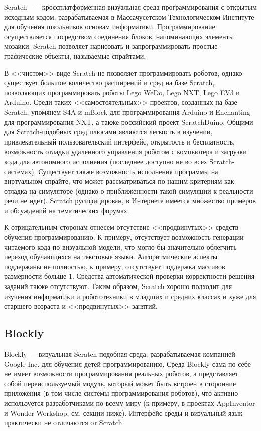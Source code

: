 \documentclass[a5paper]{article}
\begin{document}
Scratch~\cite{resnick2009scratch} --- кроссплатформенная визуальная среда программирования с 
открытым исходным кодом, разрабатываемая 
в Массачусетском Технологическом Институте для обучения школьников основам информатики. Программирование 
осуществляется посредством соединения блоков, напоминающих элементы мозаики. Scratch позволяет нарисовать 
и запрограммировать простые графические объекты, называемые спрайтами. 

В <<чистом>> виде Scratch не позволяет программировать роботов, однако существует большое количество расширений и 
сред на базе Scratch, позволяющих программировать роботы Lego WeDo, Lego NXT, Lego EV3 и Arduino.  Среди таких 
<<самостоятельных>> проектов, созданных на базе Scratch, упомянем S4A и mBlock для программирования Arduino и 
Enchanting для программирования NXT, а также российский проект ScratchDuino. Общими для Scratch-подобных 
сред плюсами являются легкость в изучении, привлекательный пользовательский интерфейс, открытость и бесплатность, 
возможность отладки удаленного управления роботом с компьютера и загрузки кода для автономного исполнения 
(последнее доступно не во всех Scratch-системах). Существует также возможность исполнения программы на виртуальном 
спрайте, что может рассматриваться по нашим критериям как отладка на симуляторе (однако о приближенности такой 
симуляции к реальности речи не идет). Scratch русифицирован, в Интернете имеется множество примеров 
и обсуждений на тематических форумах. 

К отрицательным сторонам отнесем отсутствие <<продвинутых>> средств обучения программированию. К примеру, 
отсутствует возможность генерации читаемого кода по визуальной модели, что могло бы значительно облегчить 
переход обучающихся на текстовые языки. Алгоритмические аспекты поддержаны не полностью, к примеру, 
отсутствует поддержка массивов размерности больше 1. Средства автоматической проверки корректности решения 
заданий также отсутствуют. Таким образом, Scratch хорошо подходит для изучения информатики и робототехники 
в младших и средних классах и хуже для старшего возраста и <<продвинутых>> занятий.

\subsection{Blockly}
\label{chapter:blockly}

Blockly --- визуальная Scratch-подобная среда, разрабатываемая компанией Google Inc. для обучения детей 
программированию. Среда Blockly сама по себе не имеет возможности программирования реальных роботов, а 
представляет собой  переиспользуемый модуль, который может быть встроен в сторонние приложения (в том 
числе системы программирования роботов), что активно используется разработчиками по всему миру (к 
примеру, в проектах AppInventor и Wonder Workshop, см. секции ниже). Интерфейс среды и  визуальный язык 
практически не отличаются от Scratch. 
\end{document}
